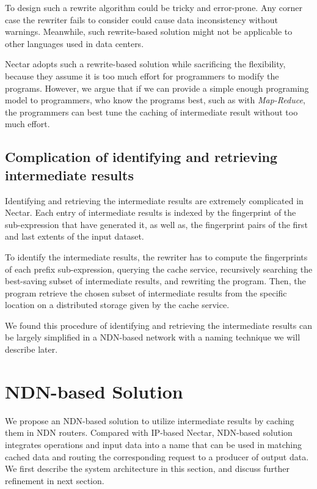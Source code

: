 \documentclass[journal]{IEEEtran}
\begin{document}
To design such a rewrite algorithm could be tricky and error-prone. Any corner
case the rewriter fails to consider could cause data inconsistency without
warnings. Meanwhile, such rewrite-based solution might not be applicable to
other languages used in data centers.

Nectar adopts such a rewrite-based solution while sacrificing the flexibility,
because they assume it is too much effort for programmers to modify the
programs. However, we argue that if we can provide a simple enough programing
model to programmers, who know the programs best, such as with
\emph{Map-Reduce}, the programmers can best tune the caching of intermediate
result without too much effort.

\subsection{Complication of identifying and retrieving intermediate results}
Identifying and retrieving the intermediate results are extremely complicated
in Nectar.  Each entry of intermediate results is indexed by the fingerprint of
the sub-expression that have generated it, as well as, the fingerprint pairs of
the first and last extents of the input dataset. 

To identify the intermediate results, the rewriter has to compute the
fingerprints of each prefix sub-expression, querying the cache service,
recursively searching the best-saving subset of intermediate results, and
rewriting the program. Then, the program retrieve the chosen subset of
intermediate results from the specific location on a distributed storage given
by the cache service.

We found this procedure of identifying and retrieving the intermediate results
can be largely simplified in a NDN-based network with a naming technique we
will describe later.

\section{NDN-based Solution}
We propose an NDN-based solution to utilize intermediate results by caching them
in NDN routers.  Compared with IP-based Nectar, NDN-based solution
integrates operations and input data into a name that can be used in matching
cached data and routing the corresponding request to a producer of output data.
We first describe the system architecture in this section, and discuss further
refinement in next section.
\end{document}

